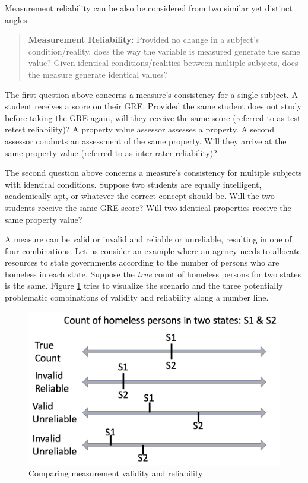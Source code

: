 \documentclass[
]{book}
\begin{document}
Measurement reliability can be also be considered from two similar yet distinct angles.

\begin{quote}
\textbf{Measurement Reliability}: Provided no change in a subject's condition/reality, does the way the variable is measured generate the same value? Given identical conditions/realities between multiple subjects, does the measure generate identical values?
\end{quote}

The first question above concerns a measure's consistency for a single subject. A student receives a score on their GRE. Provided the same student does not study before taking the GRE again, will they receive the same score (referred to as test-retest reliability)? A property value assessor assesses a property. A second assessor conducts an assessment of the same property. Will they arrive at the same property value (referred to as inter-rater reliability)?

The second question above concerns a measure's consistency for multiple subjects with identical conditions. Suppose two students are equally intelligent, academically apt, or whatever the correct concept should be. Will the two students receive the same GRE score? Will two identical properties receive the same property value?

A measure can be valid or invalid and reliable or unreliable, resulting in one of four combinations. Let us consider an example where an agency needs to allocate resources to state governments according to the number of persons who are homeless in each state. Suppose the \emph{true} count of homeless persons for two states is the same. Figure \ref{fig:homeless} tries to visualize the scenario and the three potentially problematic combinations of validity and reliability along a number line.

\begin{figure}

{\centering \includegraphics[width=\textwidth]{images/measure_lines} 

}

\caption{Comparing measurement validity and reliability}\label{fig:homeless}
\end{figure}
\end{document}
